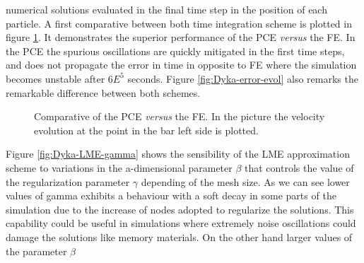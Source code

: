 numerical solutions evaluated in the final time step in the position
of each particle. A first comparative between both time integration
scheme is plotted in figure \ref{fig:Dyka-PCE-FE}. It demonstrates the
superior performance of the PCE \textit{versus} the FE. In the PCE the
spurious oscillations are quickly mitigated in the first time steps,
and does not propagate the error in time in opposite to FE where the
simulation becomes unstable after $6E^{5}$ seconds. Figure
\ref{fig:Dyka-error-evol} also remarks the remarkable difference
between both schemes. 
\begin{figure}\sidecaption
  \centering
  \caption{Comparative of the PCE \textit{versus} the FE. In the
    picture the velocity evolution at the point in the bar left side
    is plotted.}
  \label{fig:Dyka-PCE-FE}
\end{figure}
Figure \eqref{fig:Dyka-LME-gamma} shows the sensibility of the LME
approximation scheme to variations in the a-dimensional parameter
$\beta$ that controls the value of the regularization parameter
$\gamma$ depending of the mesh size. As we can see lower values of
gamma exhibits a behaviour with a soft decay in some parts of the
simulation due to the increase of nodes adopted to regularize the
solutions. This capability could be useful in simulations where
extremely noise oscillations could damage the solutions like memory
materials. On the other hand larger values of the parameter $\beta$
